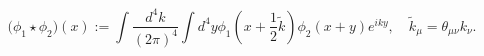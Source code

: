 \begin{equation}
\Big(\phi_1\star\phi_2\Big)(x) := \int \frac{d^4 k}{(2\pi)^4}\int d^4y 
\phi_1(x+\frac12\tilde k)\phi_2(x+y)e^{iky},\quad  \tilde k_\mu 
= \theta_{\mu\nu}k_\nu.
\end{equation}

